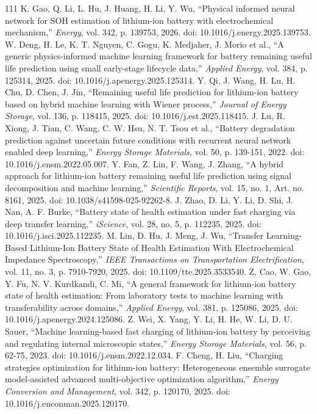 \documentclass[journal]{IEEEtran}
\begin{document}
\begin{thebibliography}{111}
K. Gao, Q. Li, L. Hu, J. Huang, H. Li, Y. Wu, ``Physical informed neural network for SOH estimation of lithium-ion battery with electrochemical mechanism,'' \emph{Energy}, vol. 342, p. 139753, 2026. doi: 10.1016/j.energy.2025.139753.
W. Deng, H. Le, K. T. Nguyen, C. Gogu, K. Medjaher, J. Morio et al., ``A generic physics-informed machine learning framework for battery remaining useful life prediction using small early-stage lifecycle data,'' \emph{Applied Energy}, vol. 384, p. 125314, 2025. doi: 10.1016/j.apenergy.2025.125314.
Y. Qi, J. Wang, H. Lu, H. Chu, D. Chen, J. Jin, ``Remaining useful life prediction for lithium-ion battery based on hybrid machine learning with Wiener process,'' \emph{Journal of Energy Storage}, vol. 136, p. 118415, 2025. doi: 10.1016/j.est.2025.118415.
J. Lu, R. Xiong, J. Tian, C. Wang, C. W. Hsu, N. T. Tsou et al., ``Battery degradation prediction against uncertain future conditions with recurrent neural network enabled deep learning,'' \emph{Energy Storage Materials}, vol. 50, p. 139-151, 2022. doi: 10.1016/j.ensm.2022.05.007.
Y. Fan, Z. Lin, F. Wang, J. Zhang, ``A hybrid approach for lithium-ion battery remaining useful life prediction using signal decomposition and machine learning,'' \emph{Scientific Reports}, vol. 15, no. 1, Art. no. 8161, 2025. doi: 10.1038/s41598-025-92262-8.
J. Zhao, D. Li, Y. Li, D. Shi, J. Nan, A. F. Burke, ``Battery state of health estimation under fast charging via deep transfer learning,'' \emph{iScience}, vol. 28, no. 5, p. 112235, 2025. doi: 10.1016/j.isci.2025.112235.
M. Lin, D. Hu, J. Meng, J. Wu, ``Transfer Learning-Based Lithium-Ion Battery State of Health Estimation With Electrochemical Impedance Spectroscopy,'' \emph{IEEE Transactions on Transportation Electrification}, vol. 11, no. 3, p. 7910-7920, 2025. doi: 10.1109/tte.2025.3533540.
Z. Cao, W. Gao, Y. Fu, N. V. Kurdkandi, C. Mi, ``A general framework for lithium-ion battery state of health estimation: From laboratory tests to machine learning with transferability across domains,'' \emph{Applied Energy}, vol. 381, p. 125086, 2025. doi: 10.1016/j.apenergy.2024.125086.
Z. Wei, X. Yang, Y. Li, H. He, W. Li, D. U. Sauer, ``Machine learning-based fast charging of lithium-ion battery by perceiving and regulating internal microscopic states,'' \emph{Energy Storage Materials}, vol. 56, p. 62-75, 2023. doi: 10.1016/j.ensm.2022.12.034.
F. Cheng, H. Liu, ``Charging strategies optimization for lithium-ion battery: Heterogeneous ensemble surrogate model-assisted advanced multi-objective optimization algorithm,'' \emph{Energy Conversion and Management}, vol. 342, p. 120170, 2025. doi: 10.1016/j.enconman.2025.120170.

\end{thebibliography}
\end{document}
